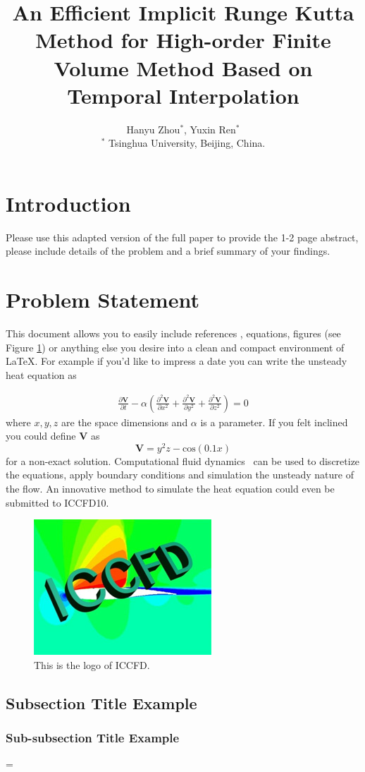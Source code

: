 \documentclass[10pt]{article}
\title{
\bf 
An Efficient Implicit Runge Kutta Method for High-order Finite Volume Method 
Based on Temporal Interpolation 
}
\author{
Hanyu Zhou$^{*}$, Yuxin Ren$^{*}$ \\
$^{*}$ Tsinghua University, Beijing, China.
}
\date{}
\newcommand{\laeq}[1]{\label{eq:#1}}
\newcommand{\figu}[1]{\ref{fig:#1}}
\newcommand{\lafi}[1]{\label{fig:#1}}
\begin{document}
\maketitle
\afterpage{\fancyhead{}}

\centerline{
}
\vskip0.5cm 

\section{Introduction}
Please use this adapted version of the full paper to provide the 1-2 page abstract, please include details of the problem and a brief summary of your findings. 


\section{Problem Statement}
This document allows you to easily include references \cite{book,journalpaper}, equations, figures (see Figure \figu{logo}) or anything else you
desire into a clean and compact environment of \LaTeX.  For example if you'd like to impress a date you can write
the unsteady heat equation as

\begin{eqnarray}
\frac{\partial \mathbf{V}}{\partial t} - \alpha \left( \frac{\partial^2 \mathbf{V}}{\partial x^2} +
       \frac{\partial^2 \mathbf{V}}{\partial y^2} +
       \frac{\partial^2 \mathbf{V}}{\partial z^2} \right)
= 0
\laeq{heat}
\end{eqnarray}
where $x, y, z$ are the space dimensions and $\alpha$ is a parameter.  If you felt inclined you could define $\mathbf{V}$ as
%
$$\mathbf{V} = y^2 z - \text{cos}(0.1 x)$$
%
for a non-exact solution.  Computational fluid dynamics~\cite{paper} can be used to discretize the equations, apply boundary conditions and 
simulation the unsteady nature of the flow.  An innovative method to simulate the heat equation could even be submitted to ICCFD10.

\begin{figure}[H]
  \centering
  \includegraphics[height=2.0in]{exampleFigure.jpg}
  \caption{This is the logo of ICCFD.}
  \lafi{logo}
\end{figure}


\subsection{Subsection Title Example}

\subsubsection{Sub-subsection Title Example}



\bibspacing=


\end{document}
